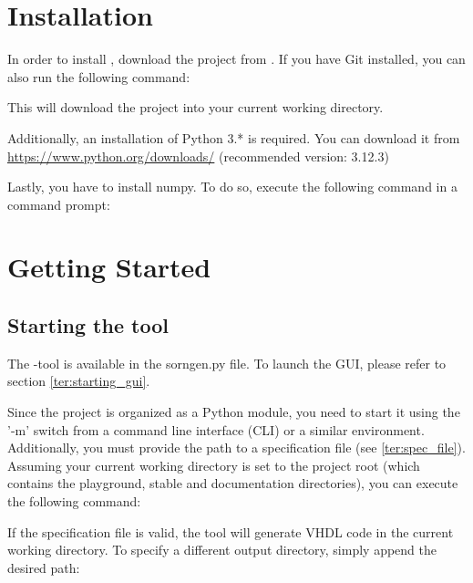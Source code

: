 \documentclass{article}
\begin{document}
\tableofcontents

\newpage


\section{Installation}
\label{sec:installation}
In order to install \ProjectName, download the project from \hrefRepo. 
If you have Git installed, you can also run the following command:

This will download the project into your current working directory.

\newpar Additionally, an installation of Python 3.* is required. You can download it from \url{https://www.python.org/downloads/} (recommended version: 3.12.3)

Lastly, you have to install numpy. To do so, execute the following command in a command prompt:


\newpage
\section{Getting Started}
\label{sec:getting_started}

\subsection{Starting the tool}
The \ProjectName-tool is available in the sorngen.py file. To launch the GUI, please refer to section \ref{ter:starting_gui}.

Since the project is organized as a Python module, you need to start it using the '-m' switch from a command line interface (CLI) or a similar environment. Additionally, you must provide the path to a specification file (see \ref{ter:spec_file}). Assuming your current working directory is set to the project root (which contains the playground, stable and documentation directories), you can execute the following command:


If the specification file is valid, the tool will generate VHDL code in the current working directory. To specify a different output directory, simply append the desired path:

\end{document}
